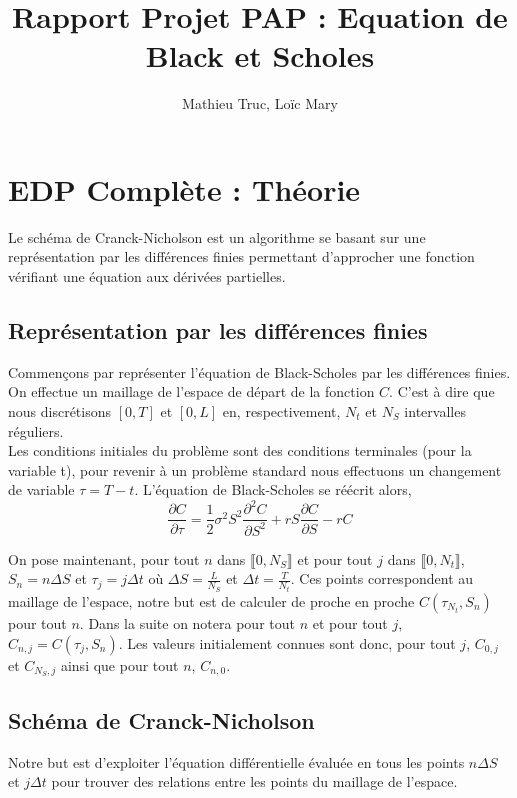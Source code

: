 \documentclass[11pt,a4paper]{article}
\author{Mathieu Truc, Loïc Mary}
\title{Rapport Projet PAP : Equation de Black et Scholes}
\date{}
\begin{document}
\maketitle

\tableofcontents
\newpage
\section{EDP Complète : Théorie}
Le schéma de Cranck-Nicholson est un algorithme se basant sur une représentation 
par les différences finies permettant d'approcher une fonction vérifiant une équation aux dérivées partielles.

\subsection{Représentation par les différences finies}
Commençons par représenter l'équation de Black-Scholes par les différences finies. On effectue un maillage de l'espace de départ de la fonction $C$. C'est à dire que nous discrétisons $[0,T]$ et $[0,L]$ en, respectivement, $N_t$ et $N_S$ intervalles réguliers. \\
Les conditions initiales du problème sont des conditions terminales (pour la variable t), pour revenir à un problème standard nous effectuons un changement de variable $\tau = T - t$. L'équation de Black-Scholes se réécrit alors,
\begin{equation}
 \frac{\partial C}{\partial \tau} = \frac{1}{2} \sigma^2 S^2 \frac{\partial^2 C}{\partial S^2} + rS\frac{\partial C}{\partial S} - rC
 \end{equation} 

On pose maintenant, pour tout $n$ dans $\llbracket 0, N_S \rrbracket$ et pour tout $j$ dans $\llbracket 0, N_t \rrbracket$, $S_n = n \Delta S$ et $\tau_j = j \Delta t$ où $\Delta S = \frac{L}{N_S}$ et $\Delta t = \frac{T}{N_t}$. Ces points correspondent au maillage de l'espace, notre but est de calculer de proche en proche $C(\tau_{N_t}, S_n)$ pour tout $n$. Dans la suite on notera pour tout $n$ et pour tout $j$, $C_{n,j} = C(\tau_j, S_n)$. Les valeurs initialement connues sont donc, pour tout $j$, $C_{0,j}$ et $C_{{N_S},j}$ ainsi que pour tout $n$, $C_{n,0}$.

\subsection{Schéma de Cranck-Nicholson}
Notre but est d'exploiter l'équation différentielle évaluée en tous les points $n\Delta S$ et $j\Delta t$ pour trouver des relations entre les points du maillage de l'espace. 
\end{document}
